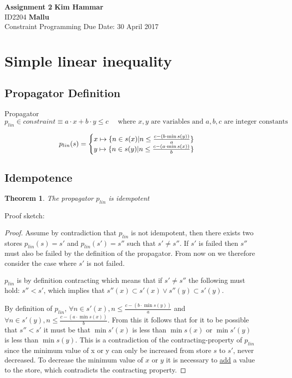 \documentclass[a4paper, 11pt]{article}
\newtheorem{theorem}{Theorem}[section]
\newcommand\mymapsto{\mathrel{\ooalign{$\rightarrow$\cr%
      \kern-.15ex\raise.275ex\hbox{\scalebox{1}[0.522]{$\mid$}}\cr}}}
\begin{document}
\noindent
\large\textbf{Assignment 2} \hfill \textbf{Kim Hammar} \\
\normalsize ID2204 \hfill  \textbf{Mallu} \\
Constraint Programming \hfill Due Date: 30 April 2017\\

\section*{Simple linear inequality}
\subsection*{Propagator Definition}
Propagator $p_{lin} \in constraint \equiv a \cdot x + b \cdot y \leq c \quad \text{ where }x,y \text{ are variables and } a,b,c \text{ are integer constants} $

\begin{gather*}
p_{lin}(s) = 
\begin{cases}
  x \mymapsto \{n \in s(x) | n \leq \frac{c - (b \cdot \min s(y))}{a} \}\\
  y \mymapsto \{n \in s(y) | n \leq \frac{c - (a \cdot \min s(x))}{b} \}\\
\end{cases}
\end{gather*}
\subsection*{Idempotence}
\begin{theorem}
The propagator $p_{lin}$ is idempotent
\end{theorem}
Proof sketch:
\begin{proof}
Assume by contradiction that $p_{lin}$ is not idempotent, then there exists two stores $p_{lin}(s) = s'$ and $p_{lin}(s') = s''$ such that  $s' \neq s''$. If $s'$ is failed then $s''$ must also be failed by the definition of the propagator. From now on we therefore consider the case where $s'$ is not failed.

  $p_{lin}$ is by definition contracting which means that if $s' \neq s''$ the following must hold: $s'' < s'$, which implies that $s''(x) \subset s'(x) \lor s''(y) \subset s'(y)$.

By definition of $p_{lin}$, $\forall n \in s'(x), n \leq  \frac{c - (b \cdot \min s(y))}{a}$ and $\forall n \in s'(y), n \leq  \frac{c - (a \cdot \min s(x))}{b}$. From this it follows that for it to be possible that $s'' < s'$ it must be that $\min s'(x)$ is less than $\min s(x)$ or $\min s'(y)$ is less than $\min s(y)$. This is a contradiction of the contracting-property of $p_{lin}$ since the minimum value of x or y can only be increased from store $s$ to $s'$, never decreased. To decrease the minimum value of $x$ or $y$ it is necessary to \underline{add} a value to the store, which contradicts the contracting property. 
\end{proof}
\end{document}

